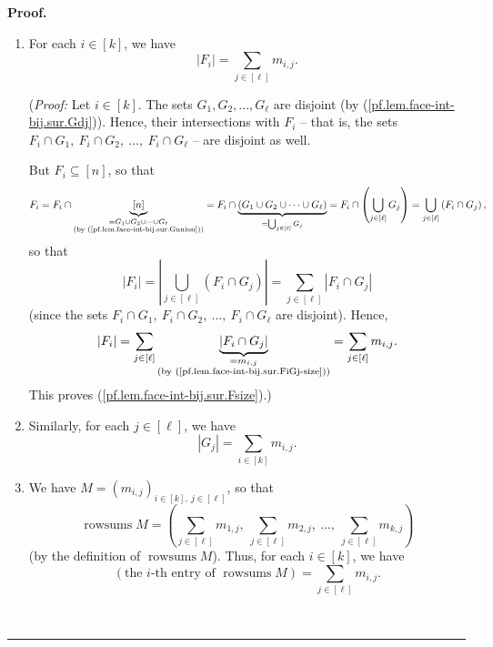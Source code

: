 \documentclass[12pt]{article}
\theoremstyle{definition}%
\theoremstyle{definition}%
\theoremstyle{remark}%
\newcommand{\interval}[1]{\left[ #1 \right]} %
\newcommand{\rowsums}{\operatorname{rowsums}}
\newenvironment{proof}[1][Proof]{\noindent\textbf{#1.} }{\ \rule{0.5em}{0.5em}}
\begin{document}
\begin{proof}
\begin{enumerate}
\item For each $i\in\interval{k}  $, we have
\begin{equation}
\left\vert F_{i}\right\vert =\sum_{j\in\interval{\ell}}m_{i,j}.
\label{pf.lem.face-int-bij.sur.Fsize}
\end{equation}


(\textit{Proof:} Let $i\in\interval{k}  $. The sets $G_{1},G_{2}
,\ldots,G_{\ell}$ are disjoint (by (\ref{pf.lem.face-int-bij.sur.Gdj})).
Hence, their intersections with $F_{i}$ -- that is, the sets $F_{i}\cap
G_{1},\ F_{i}\cap G_{2},\ \ldots,\ F_{i}\cap G_{\ell}$ -- are disjoint as well.

But $F_{i}\subseteq\interval{n}$, so that
\[
F_{i}=F_{i}\cap\underbrace{\interval{n}}_{\substack{=G_{1}\cup G_{2}
\cup\cdots\cup G_{\ell}\\\text{(by (\ref{pf.lem.face-int-bij.sur.Gunion}))}
}}=F_{i}\cap\underbrace{\left(  G_{1}\cup G_{2}\cup\cdots\cup G_{\ell}\right)
}_{=\bigcup_{j\in\interval{\ell}}G_{j}}=F_{i}\cap\left(  \bigcup
_{j\in\interval{\ell}}G_{j}\right)  =\bigcup_{j\in\interval{\ell}
}\left(  F_{i}\cap G_{j}\right)  ,
\]
so that
\[
\left\vert F_{i}\right\vert =\left\vert \bigcup_{j\in\interval{\ell}
}\left(  F_{i}\cap G_{j}\right)  \right\vert =\sum_{j\in\interval{\ell}
}\left\vert F_{i}\cap G_{j}\right\vert
\]
(since the sets $F_{i}\cap G_{1},\ F_{i}\cap G_{2},\ \ldots,\ F_{i}\cap
G_{\ell}$ are disjoint). Hence,
\[
\left\vert F_{i}\right\vert =\sum_{j\in\interval{\ell}}
\underbrace{\left\vert F_{i}\cap G_{j}\right\vert }_{\substack{=m_{i,j}
\\\text{(by (\ref{pf.lem.face-int-bij.sur.FiGj-size}))}}}=\sum_{j\in
\interval{\ell}}m_{i,j}.
\]
This proves (\ref{pf.lem.face-int-bij.sur.Fsize}).)

\item Similarly, for each $j\in\interval{\ell}$, we have
\begin{equation}
\left\vert G_{j}\right\vert =\sum_{i\in\interval{k}  }m_{i,j}.
\label{pf.lem.face-int-bij.sur.Gsize}
\end{equation}


\item We have $M=\left(  m_{i,j}\right)  _{i\in\interval{k}
,\ j\in\interval{\ell}}$, so that
\begin{equation}
\rowsums M=\left(  \sum_{j\in\interval{\ell}}
m_{1,j},\ \sum_{j\in\interval{\ell}}m_{2,j},\ \ldots,\ \sum_{j\in
\interval{\ell}}m_{k,j}\right)
\label{pf.lem.face-int-bij.sur.rsM}
\end{equation}
(by the definition of $\rowsums M$). Thus, for each $i\in
\interval{k}$, we have
\begin{equation}
\left(  \text{the }i\text{-th entry of }\rowsums M\right)
=\sum_{j\in\interval{\ell}}m_{i,j}.
\label{pf.lem.face-int-bij.sur.rsM2}
\end{equation}



\end{enumerate}
\end{proof}
\end{document}
